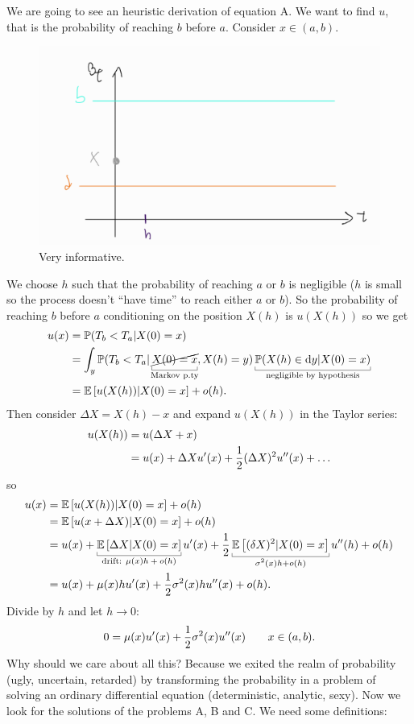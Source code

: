 \documentclass[12pt]{report}
\begin{document}
	We are going to see an heuristic derivation of equation A. We want to find $u$, that is the probability of reaching $b$ before $a$. Consider $x\in(a,b)$.
\begin{figure}[H]
	\centering
	\includegraphics[width=0.6\linewidth]{img/screenshot057}
	\caption{Very informative.}
	\label{fig:screenshot057}
\end{figure}
We choose $h$ such that the probability of reaching $a$ or $b$ is negligible ($h$ is small so the process doesn't ``have time'' to reach either $a$ or $b$). So the probability of reaching $b$ before $a$ conditioning on the position $X(h)$ is $u(X(h))$ so we get
\begin{align*}
	u(x)&=\pr(T_{b}<T_{a}|X(0)=x)\\
	&=\int_{y}\pr(T_{b}<T_{a}|\ubracketthin{\cancel{X(0)=x}}_{\claptext{Markov p.ty}},X(h)=y)\ubracketthin{\pr(X(h)\in\dy|X(0)=x)}_{\claptext{negligible by hypothesis}}\\
	&=\ev{u(X(h))|X(0)=x}+o(h).
\end{align*}
Then consider $\Delta X=X(h)-x$ and expand $u(X(h))$ in the Taylor series:
\begin{align*}
	u(X(h))&=u(\Delta X+x)\\
	&=u(x)+\Delta Xu'(x)+\frac{1}{2}(\Delta X)^{2}u''(x)+\ldots
\end{align*}
so
\begin{align*}
	u(x)&=\ev{u(X(h))|X(0)=x}+o(h)\\
	&=\ev{u(x+\Delta X)|X(0)=x}+o(h)\\
	&=u(x)+\ubracketthin{\ev{\Delta X|X(0)=x}}_{\claptext{drift: $\mu(x)h+o(h)$}}u'(x)+\unmezz\ubracketthin{\ev{(\delta X)^{2}|X(0)=x}}_{\mathclap{\sigma^{2}(x)h+o(h)}}u''(h)+o(h)\\
	&=u(x)+\mu(x)hu'(x)+\unmezz\sigma^{2}(x)hu''(x)+o(h).
\end{align*}
Divide by $h$ and let $h\to0$:
\begin{equation*}
	0=\mu(x)u'(x)+\frac{1}{2}\sigma^{2}(x)u''(x)\qquad x\in(a,b).
\end{equation*}
Why should we care about all this? Because we exited the realm of probability (ugly, uncertain, retarded) by transforming the probability in a problem of solving an ordinary differential equation (deterministic, analytic, sexy). Now we look for the solutions of the problems A, B and C. We need some definitions:
\end{document}

